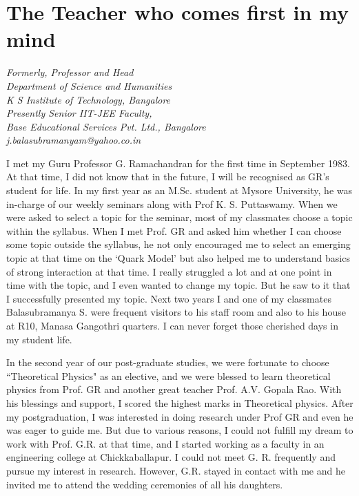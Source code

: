 
\chapter{The Teacher who comes first in my mind}\label{chap33}





\begin{center}
\textit{Formerly, Professor and Head}\\
\textit{Department of Science and Humanities}\\
\textit{K S Institute of Technology, Bangalore}\\
\textit{Presently Senior IIT-JEE Faculty, }\\
\textit{Base Educational Services Pvt. Ltd., Bangalore}\\
\textit{j.balasubramanyam@yahoo.co.in}
\end{center}


I met my Guru Professor G. Ramachandran for the first time in September 1983. At that time, I did not know that in the future, I will be recognised as GR's student for life. In my first year as an M.Sc. student at Mysore University, he was in-charge of our weekly seminars along with Prof K. S. Puttaswamy. When we were asked to select a topic for the seminar, most of my classmates choose a topic within the syllabus. When I met Prof. GR and asked him whether I can choose some topic outside the syllabus, he not only encouraged me to select an emerging topic at that time on the `Quark Model' but also helped me to understand basics of strong interaction at that time. I really struggled a lot and at one point in time with the topic, and I even wanted to change my topic. But he saw to it that I successfully presented my topic. Next two years I and one of my classmates Balasubramanya S. were frequent visitors to his staff room and also to his house at R10, Manasa Gangothri quarters. I can never forget those cherished days in my student life. 

In the second year of our post-graduate studies, we were fortunate to choose ``Theoretical Physics" as an elective, and we were blessed to learn theoretical physics from Prof. GR and another great teacher Prof. A.V. Gopala Rao. With his blessings and support, I scored the highest marks in Theoretical physics. After my postgraduation, I was interested in doing research under Prof GR and even he was eager to guide me. But due to various reasons, I could not fulfill my dream to work with Prof. G.R. at that time, and I started working as a faculty in an engineering college at Chickkaballapur. I could not meet G. R. frequently and pursue my interest in research. However, G.R. stayed in contact with me and he invited me to attend the wedding ceremonies of all his daughters. 

